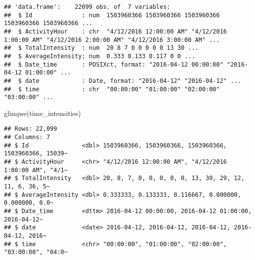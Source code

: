 \documentclass[
]{article}
\newenvironment{Shaded}{\begin{snugshade}}{\end{snugshade}}
\newcommand{\AttributeTok}[1]{\textcolor[rgb]{0.77,0.63,0.00}{#1}}
\newcommand{\FunctionTok}[1]{\textcolor[rgb]{0.00,0.00,0.00}{#1}}
\newcommand{\NormalTok}[1]{#1}
\newcommand{\OtherTok}[1]{\textcolor[rgb]{0.56,0.35,0.01}{#1}}
\newcommand{\SpecialCharTok}[1]{\textcolor[rgb]{0.00,0.00,0.00}{#1}}
\newcommand{\StringTok}[1]{\textcolor[rgb]{0.31,0.60,0.02}{#1}}
\begin{document}
\begin{Shaded}
\end{Shaded}

\begin{verbatim}
## 'data.frame':    22099 obs. of  7 variables:
##  $ Id              : num  1503960366 1503960366 1503960366 1503960366 1503960366 ...
##  $ ActivityHour    : chr  "4/12/2016 12:00:00 AM" "4/12/2016 1:00:00 AM" "4/12/2016 2:00:00 AM" "4/12/2016 3:00:00 AM" ...
##  $ TotalIntensity  : num  20 8 7 0 0 0 0 0 13 30 ...
##  $ AverageIntensity: num  0.333 0.133 0.117 0 0 ...
##  $ Date_time       : POSIXct, format: "2016-04-12 00:00:00" "2016-04-12 01:00:00" ...
##  $ date            : Date, format: "2016-04-12" "2016-04-12" ...
##  $ time            : chr  "00:00:00" "01:00:00" "02:00:00" "03:00:00" ...
\end{verbatim}

\begin{Shaded}
\begin{Highlighting}[]
\FunctionTok{glimpse}\NormalTok{(time\_intensities)}
\end{Highlighting}
\end{Shaded}

\begin{verbatim}
## Rows: 22,099
## Columns: 7
## $ Id               <dbl> 1503960366, 1503960366, 1503960366, 1503960366, 15039~
## $ ActivityHour     <chr> "4/12/2016 12:00:00 AM", "4/12/2016 1:00:00 AM", "4/1~
## $ TotalIntensity   <dbl> 20, 8, 7, 0, 0, 0, 0, 0, 13, 30, 29, 12, 11, 6, 36, 5~
## $ AverageIntensity <dbl> 0.333333, 0.133333, 0.116667, 0.000000, 0.000000, 0.0~
## $ Date_time        <dttm> 2016-04-12 00:00:00, 2016-04-12 01:00:00, 2016-04-12~
## $ date             <date> 2016-04-12, 2016-04-12, 2016-04-12, 2016-04-12, 2016~
## $ time             <chr> "00:00:00", "01:00:00", "02:00:00", "03:00:00", "04:0~
\end{verbatim}
\end{document}
